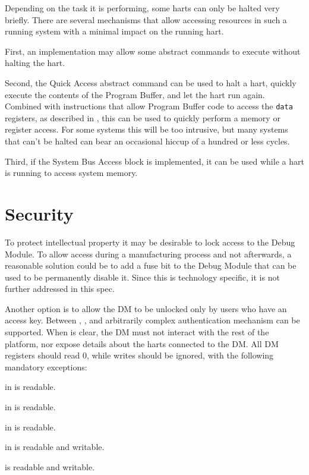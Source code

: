 Depending on the task it is performing, some harts can only be halted very briefly.
There are several mechanisms that allow accessing resources in such a running system
with a minimal impact on the running hart.

First, an implementation may allow some abstract commands to execute without halting the hart.

Second, the Quick Access abstract command can be used to halt a hart, quickly
execute the contents of the Program Buffer, and let the hart run again.
Combined with instructions that allow Program Buffer code to access the
{\tt data} registers, as described in \RdmHartinfo, this can be used to quickly
perform a memory or register access. For some systems this will be too
intrusive, but many systems that can't be halted can bear an occasional hiccup
of a hundred or less cycles.

Third, if the System Bus Access block is implemented, it can be used while a
hart is running to access system memory.

\section{Security}

To protect intellectual property it may be desirable to lock access to the
Debug Module.  To allow access during a manufacturing process and not
afterwards, a reasonable solution could be to add a fuse bit to the Debug
Module that can be used to be permanently disable it. Since this is technology
specific, it is not further addressed in this spec.

Another option is to allow the DM to be unlocked only by users who have an
access key. Between \FdmDmstatusAuthenticated, \FdmDmstatusAuthbusy, and \RdmAuthdata arbitrarily
complex authentication mechanism can be supported.  When \FdmDmstatusAuthenticated is
clear, the DM must not interact with the rest of the platform, nor expose
details about the harts connected to the DM. All DM registers should read 0,
while writes should be ignored, with the following mandatory exceptions:
\begin{steps}{}
    \item \FdmDmstatusAuthenticated in \RdmDmstatus is readable.
    \item \FdmDmstatusAuthbusy in \RdmDmstatus is readable.
    \item \FdmDmstatusVersion in \RdmDmstatus is readable.
    \item \FdmDmcontrolDmactive in \RdmDmcontrol is readable and writable.
    \item \RdmAuthdata is readable and writable.
\end{steps}

